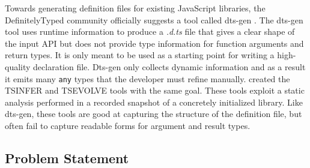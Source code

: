 \documentclass[sigplan,10pt,anonymous]{acmart} %
\theoremstyle{plain}
\theoremstyle{remark}
\theoremstyle{definition}
\begin{document}
%
Towards generating definition files for existing JavaScript libraries,
the DefinitelyTyped
community officially suggests a tool called dts-gen \citep{dtsgen}.
The dts-gen tool uses runtime information to produce a \textit{.d.ts} file that gives a
clear shape of the input API but does not provide type information for
function arguments and return types.
It is only meant to be used as a starting
point for writing a high-quality declaration file. Dts-gen only collects
dynamic information and as a result it emits many \texttt{any} types that the developer must refine manually.
\citet{tstools2017} created the TSINFER and TSEVOLVE tools with the same goal.
These tools exploit a static analysis performed in a
recorded snapshot of a concretely initialized library.
Like dts-gen, these tools are good at capturing the structure of the definition file,
but often fail to capture readable forms for argument and result types.

\subsection{Problem Statement}\label{ssec:problem}
% 


\end{document}
